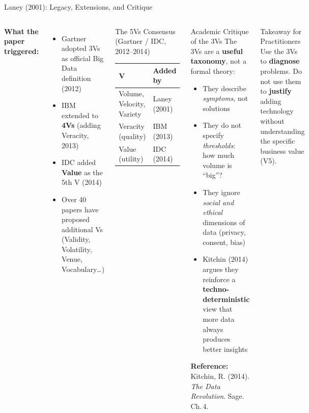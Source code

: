 \documentclass[aspectratio=169,10pt]{beamer}
\begin{document}
\begin{frame}{Laney (2001): Legacy, Extensions, and Critique}
  \begin{columns}[T]
      \textbf{What the paper triggered:}
      \begin{itemize}
        \item Gartner adopted 3Vs as official Big Data definition (2012)
        \item IBM extended to \textbf{4Vs} (adding Veracity, 2013)
        \item IDC added \textbf{Value} as the 5th V (2014)
        \item Over 40 papers have proposed additional Vs (Validity, Volatility, Venue, Vocabulary\ldots)
      \end{itemize}
      \vspace{6pt}
      \begin{exampleblock}{The 5Vs Consensus (Gartner / IDC, 2012--2014)}
        \small
        \begin{tabular}{ll}
          \toprule
          V & Added by \\
          \midrule
          Volume, Velocity, Variety & Laney (2001) \\
          Veracity (quality) & IBM (2013) \\
          Value (utility) & IDC (2014) \\
          \bottomrule
        \end{tabular}
      \end{exampleblock}

      \begin{alertblock}{Academic Critique of the 3Vs}
        The 3Vs are a \textbf{useful taxonomy}, not a formal theory:
        \vspace{4pt}
        \begin{itemize}
          \item They describe \emph{symptoms}, not solutions
          \item They do not specify \emph{thresholds}: how much volume is ``big''?
          \item They ignore \emph{social and ethical} dimensions of data (privacy, consent, bias)
          \item Kitchin (2014) argues they reinforce a \textbf{techno-deterministic} view that more data always produces better insights
        \end{itemize}
        \vspace{4pt}
        \textbf{Reference:} Kitchin, R. (2014). \textit{The Data Revolution}. Sage. Ch.\,4.
      \end{alertblock}
      \vspace{4pt}
      \begin{block}{Takeaway for Practitioners}
        Use the 3Vs to \textbf{diagnose} problems.  Do not use them to \textbf{justify} adding technology without understanding the specific business value (V5).
      \end{block}
  \end{columns}
\end{frame}
\end{document}
